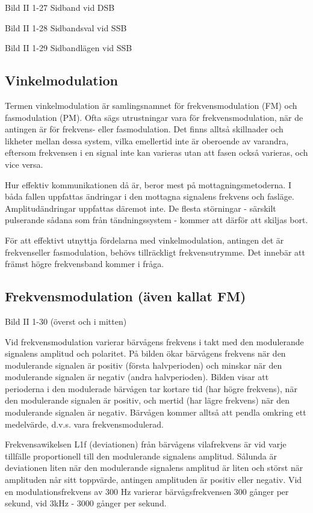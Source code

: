 Bild II 1-27 Sidband vid DSB

Bild II 1-28 Sidbandsval vid SSB

Bild II 1-29 Sidbandlägen vid SSB

\subsection{Vinkelmodulation}
Termen vinkelmodulation är samlingsnamnet för frekvensmodulation (FM) och fasmodulation
(PM). Ofta sägs utrustningar vara för frekvensmodulation, när de antingen är för frekvens-
eller fasmodulation. Det finns alltså skillnader och likheter mellan dessa system, vilka
emellertid inte är oberoende av varandra, eftersom frekvensen i en signal inte kan
varieras utan att fasen också varieras, och vice versa.

Hur effektiv kommunikationen då är, beror mest på mottagningsmetoderna. I båda fallen
uppfattas ändringar i den mottagna signalens frekvens och fasläge. Amplitudändringar
uppfattas däremot inte. De flesta störningar - särskilt pulserande sådana som från
tändningssystem - kommer att därför att skiljas bort.

För att effektivt utnyttja fördelarna med vinkelmodulation, antingen det är frekvenseller
fasmodulation, behövs tillräckligt frekvensutrymme. Det innebär att främst högre
frekvensband kommer i fråga.

\subsection{Frekvensmodulation (även kallat FM)}

Bild II 1-30 (överst och i mitten)

Vid frekvensmodulation varierar bärvågens frekvens i takt med den modulerande signalens
amplitud och polaritet. På bilden ökar bärvågens frekvens när den modulerande signalen är
positiv (första halvperioden) och minskar när den modulerande signalen är negativ (andra
halvperioden). Bilden visar att perioderna i den modulerade bärvågen tar kortare tid (har
högre frekvens), när den modulerande signalen är positiv, och mertid (har lägre frekvens)
när den modulerande signalen är negativ. Bärvågen kommer alltså att pendla omkring ett
medelvärde, d.v.s. vara frekvensmodulerad.

Frekvensawikelsen L1f (deviationen) från bärvågens vilafrekvens är vid varje tillfälle
proportionell till den modulerande signalens amplitud. Sålunda är deviationen liten när
den modulerande signalens amplitud är liten och störst när amplituden når sitt toppvärde,
antingen amplituden är positiv eller negativ. Vid en modulationsfrekvens av 300 Hz
varierar bärvågsfrekvensen 300 gånger per sekund, vid 3kHz - 3000 gånger per sekund.

